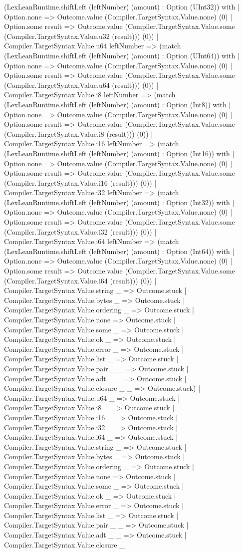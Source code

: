 \documentclass[11pt]{article}
\begin{document}
(LexLeanRuntime.shiftLeft (leftNumber) (amount) : Option (UInt32)) with | Option.none => Outcome.value (Compiler.TargetSyntax.Value.none) (0) | Option.some result => Outcome.value (Compiler.TargetSyntax.Value.some (Compiler.TargetSyntax.Value.u32 (result))) (0)) | Compiler.TargetSyntax.Value.u64 leftNumber => (match (LexLeanRuntime.shiftLeft (leftNumber) (amount) : Option (UInt64)) with | Option.none => Outcome.value (Compiler.TargetSyntax.Value.none) (0) | Option.some result => Outcome.value (Compiler.TargetSyntax.Value.some (Compiler.TargetSyntax.Value.u64 (result))) (0)) | Compiler.TargetSyntax.Value.i8 leftNumber => (match (LexLeanRuntime.shiftLeft (leftNumber) (amount) : Option (Int8)) with | Option.none => Outcome.value (Compiler.TargetSyntax.Value.none) (0) | Option.some result => Outcome.value (Compiler.TargetSyntax.Value.some (Compiler.TargetSyntax.Value.i8 (result))) (0)) | Compiler.TargetSyntax.Value.i16 leftNumber => (match (LexLeanRuntime.shiftLeft (leftNumber) (amount) : Option (Int16)) with | Option.none => Outcome.value (Compiler.TargetSyntax.Value.none) (0) | Option.some result => Outcome.value (Compiler.TargetSyntax.Value.some (Compiler.TargetSyntax.Value.i16 (result))) (0)) | Compiler.TargetSyntax.Value.i32 leftNumber => (match (LexLeanRuntime.shiftLeft (leftNumber) (amount) : Option (Int32)) with | Option.none => Outcome.value (Compiler.TargetSyntax.Value.none) (0) | Option.some result => Outcome.value (Compiler.TargetSyntax.Value.some (Compiler.TargetSyntax.Value.i32 (result))) (0)) | Compiler.TargetSyntax.Value.i64 leftNumber => (match (LexLeanRuntime.shiftLeft (leftNumber) (amount) : Option (Int64)) with | Option.none => Outcome.value (Compiler.TargetSyntax.Value.none) (0) | Option.some result => Outcome.value (Compiler.TargetSyntax.Value.some (Compiler.TargetSyntax.Value.i64 (result))) (0)) | Compiler.TargetSyntax.Value.string \_ => Outcome.stuck | Compiler.TargetSyntax.Value.bytes \_ => Outcome.stuck | Compiler.TargetSyntax.Value.ordering \_ => Outcome.stuck | Compiler.TargetSyntax.Value.none => Outcome.stuck | Compiler.TargetSyntax.Value.some \_ => Outcome.stuck | Compiler.TargetSyntax.Value.ok \_ => Outcome.stuck | Compiler.TargetSyntax.Value.error \_ => Outcome.stuck | Compiler.TargetSyntax.Value.list \_ => Outcome.stuck | Compiler.TargetSyntax.Value.pair \_ \_ => Outcome.stuck | Compiler.TargetSyntax.Value.adt \_ \_ => Outcome.stuck | Compiler.TargetSyntax.Value.closure \_ \_ => Outcome.stuck) | Compiler.TargetSyntax.Value.u64 \_ => Outcome.stuck | Compiler.TargetSyntax.Value.i8 \_ => Outcome.stuck | Compiler.TargetSyntax.Value.i16 \_ => Outcome.stuck | Compiler.TargetSyntax.Value.i32 \_ => Outcome.stuck | Compiler.TargetSyntax.Value.i64 \_ => Outcome.stuck | Compiler.TargetSyntax.Value.string \_ => Outcome.stuck | Compiler.TargetSyntax.Value.bytes \_ => Outcome.stuck | Compiler.TargetSyntax.Value.ordering \_ => Outcome.stuck | Compiler.TargetSyntax.Value.none => Outcome.stuck | Compiler.TargetSyntax.Value.some \_ => Outcome.stuck | Compiler.TargetSyntax.Value.ok \_ => Outcome.stuck | Compiler.TargetSyntax.Value.error \_ => Outcome.stuck | Compiler.TargetSyntax.Value.list \_ => Outcome.stuck | Compiler.TargetSyntax.Value.pair \_ \_ => Outcome.stuck | Compiler.TargetSyntax.Value.adt \_ \_ => Outcome.stuck | Compiler.TargetSyntax.Value.closure \_ 
\end{document}
